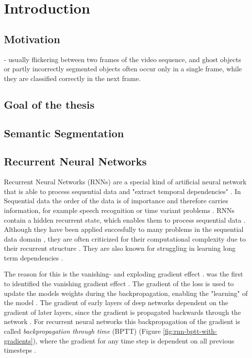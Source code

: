 \documentclass[11pt,
  paper=a4, 
  bibliography=totocnumbered,
	captions=tableheading,
	BCOR=10mm
]{scrreprt}
\theoremstyle{definition}
\newcommand{\figref}[1]{(Figure \ref{#1})}
\begin{document}


\chapter{Introduction}
\section{Motivation}
- usually flickering between two frames of the video sequence, 
and ghost objects or partly incorrectly segmented objects often occur only in a single frame, 
while they are classified correctly in the next frame.\cite{Pfeuffer2_2019}

\section{Goal of the thesis}
\section{Semantic Segmentation}
\section{Recurrent Neural Networks}

Recurrent Neural Networks (RNNs) are a special kind of artificial neural network that is able to process sequential data \cite{Valipour2017, Sherstinsky2020} and "extract temporal dependencies" \cite{Hochreiter1998}.
In Sequential data the order of the data is of importance and therefore carries information, for example speech recognition or time variant problems \cite{Hoffmann2017, Pfeuffer2_2019}.
RNNs contain a hidden recurrent state, which enables them to process sequential data \cite{Hoffmann2017, Valipour2017}.
Although they have been applied succesfully to many problems in the sequential data domain \cite{Sherstinsky2020}, they are often criticized for their computational complexity due to their recurrent structure \cite{Pfeuffer2_2019}.
They are also known for struggling in learning long term dependencies \cite{Hoffmann2017}.

The reason for this is the vanishing- and exploding gradient effect \cite{Hochreiter1998}.
\textcite{Hochreiter1991} was the first to identified the vanishing gradient effect \cite{Skansi2018}.
The gradient of the loss is used to update the models weights during the backpropagation, enabling the "learning" of the model \cite{Suzuki2017, Skansi2018}.
The gradient of early layers of deep networks dependent on the gradient of later layers, since the gradient is propagated backwards through the network \cite{Skansi2018}.
For recurrent neural networks this backpropagation of the gradient is called \textit{backpropagation through time} (BPTT) \figref{fig:rnn-bptt-with-gradients}, 
where the gradient for any time step is dependent on all previous timesteps \cite{Skansi2018}.
\end{document}
